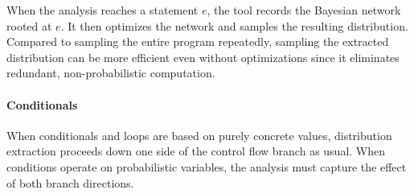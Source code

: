 When the analysis reaches a statement \passert $e$, the tool records the Bayesian network
rooted at $e$. It then optimizes the network and samples the
resulting distribution.
Compared to sampling the entire program repeatedly, sampling the extracted
distribution can be more efficient even without optimizations since it
eliminates redundant, non-probabilistic
computation. 


\label{passert:sec:conditionals}


\paragraph{Conditionals}
When conditionals and loops are based on purely
concrete values, distribution extraction proceeds down one side
of the control flow branch as usual. When conditions operate on probabilistic variables, the analysis
must capture the effect of both branch directions.

